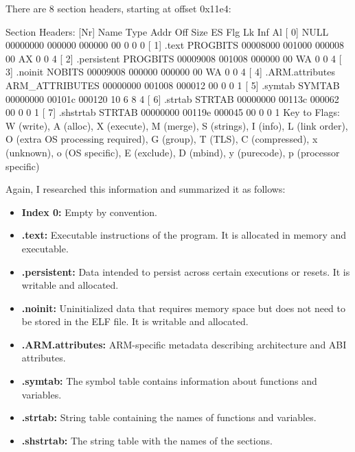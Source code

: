 \begin{terminal}
There are 8 section headers, starting at offset 0x11e4:

Section Headers:
  [Nr] Name              Type            Addr     Off    Size   ES Flg Lk Inf Al
  [ 0]                   NULL            00000000 000000 000000 00      0   0  0
  [ 1] .text             PROGBITS        00008000 001000 000008 00  AX  0   0  4
  [ 2] .persistent       PROGBITS        00009008 001008 000000 00  WA  0   0  4
  [ 3] .noinit           NOBITS          00009008 000000 000000 00  WA  0   0  4
  [ 4] .ARM.attributes   ARM_ATTRIBUTES  00000000 001008 000012 00      0   0  1
  [ 5] .symtab           SYMTAB          00000000 00101c 000120 10      6   8  4
  [ 6] .strtab           STRTAB          00000000 00113c 000062 00      0   0  1
  [ 7] .shstrtab         STRTAB          00000000 00119e 000045 00      0   0  1
Key to Flags:
  W (write), A (alloc), X (execute), M (merge), S (strings), I (info),
  L (link order), O (extra OS processing required), G (group), T (TLS),
  C (compressed), x (unknown), o (OS specific), E (exclude),
  D (mbind), y (purecode), p (processor specific)
\end{terminal}

Again, I researched this information and summarized it as follows:

\begin{itemize}
    \item \textbf{Index 0:} Empty by convention.
    \item \textbf{.text:} Executable instructions of the program. It is allocated in memory and executable.
    \item \textbf{.persistent:} Data intended to persist across certain executions or resets. It is writable and allocated.
    \item \textbf{.noinit:} Uninitialized data that requires memory space but does not need to be stored in the ELF file. It is writable and allocated.
    \item \textbf{.ARM.attributes:} ARM-specific metadata describing architecture and ABI attributes.
    \item \textbf{.symtab:} The symbol table contains information about functions and variables.
    \item \textbf{.strtab:} String table containing the names of functions and variables.
    \item \textbf{.shstrtab:} The string table with the names of the sections.
\end{itemize}

